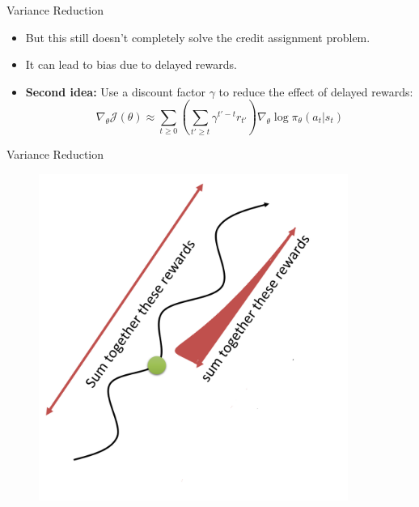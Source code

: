 \begin{frame}{Variance Reduction}
\begin{itemize}
    \item But this still doesn't completely solve the credit assignment problem.
    \item It can lead to bias due to delayed rewards.
    \pause
    \item \textbf{Second idea:} Use a discount factor $\gamma$ to reduce the effect of delayed rewards:
    $$\nabla_\theta \mathcal{J}(\theta) \approx \sum_{t \geq 0} \left( \sum_{t' \geq t} \gamma^{t'-t} r_{t'} \right ) \nabla_\theta \log \pi_\theta (a_t|s_t) $$
\end{itemize}
\end{frame}

\begin{frame}{Variance Reduction}
\begin{figure}
\centering
\includegraphics[width=0.9\textwidth,height=0.9\textheight,keepaspectratio]{images/policygrad+reinforce+actor/var_red_2.png}
\end{figure}
\end{frame}

